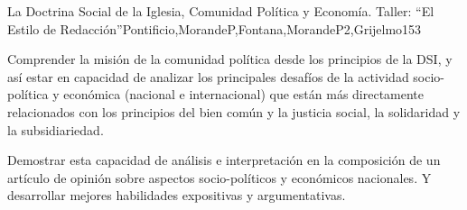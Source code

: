 \begin{syllabus}
\begin{unit}{La Doctrina Social de la Iglesia, Comunidad Política y Economía. Taller: ``El Estilo de Redacción''}{Pontificio,MorandeP,Fontana,MorandeP2,Grijelmo}{15}{3}
\begin{topics}
\end{topics}
\begin{unitgoals}
	\item Comprender la misión de la comunidad política desde los principios de la DSI, y así estar en capacidad de analizar los principales desafíos de la actividad socio-política y económica (nacional e internacional) que están más directamente relacionados con los principios del bien común y la justicia social, la solidaridad y la subsidiariedad.
	\item Demostrar esta capacidad de análisis e interpretación en la composición de un artículo de opinión sobre aspectos socio-políticos y económicos nacionales. Y desarrollar mejores habilidades expositivas y argumentativas.
\end{unitgoals}
\end{unit}



\begin{coursebibliography}
\end{coursebibliography}
\end{syllabus}
